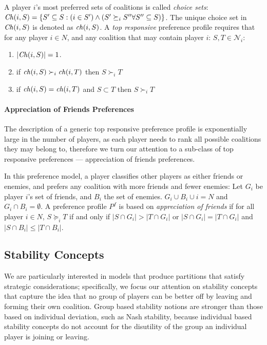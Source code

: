 A player $i$'s most preferred sets of coalitions is called \textit{choice sets}: $\mathit{Ch}(i, S) = \{S' \subseteq S: (i \in S') \wedge (S' \succeq_i S'' \forall S'' \subseteq S)\}$. The unique choice set in $\mathit{Ch}(i, S)$ is denoted as $\mathit{ch}(i, S)$. A {\em top responsive} preference profile requires that for any player $i \in N$, and any coalition that may contain player $i$: $S, T \in \mathcal{N}_i$:
\begin{enumerate}
  \item $|\mathit{Ch}(i, S)| = 1$.
  \item if $\mathit{ch}(i, S) \succ_i \mathit{ch}(i, T)$ then $S \succ_i T$
  \item if $\mathit{ch}(i, S) = \mathit{ch}(i, T)$ and $S \subset T$ then $S \succ_i T$
\end{enumerate}

\paragraph{Appreciation of Friends Preferences}
The description of a generic top responsive preference profile is exponentially large in the number of players, as each player needs to rank all possible coalitions they may belong to, therefore we turn our attention to a sub-class of top responsive preferences –-- appreciation of friends preferences.

In this preference model, a player classifies other players as either friends or enemies, and prefers any coalition with more friends and fewer enemies: Let $G_i$ be player $i$'s set of friends, and $B_i$ the set of enemies. $G_i \cup B_i \cup i = N$ and $G_i \cap B_i = \emptyset$. A preference profile $P^f$ is based on \textit{appreciation of friends} if for all player $i \in N$, $S \succeq_i T$ if and only if $|S \cap G_i| > |T \cap G_i|$ or $|S \cap G_i| = |T \cap G_i|$ and $|S \cap B_i| \leq |T \cap B_i|$.

\subsection{Stability Concepts} \label{subsec:stability}
We are particularly interested in models that produce partitions that satisfy strategic considerations; specifically, we focus our attention on stability concepts that capture the idea that no group of players can be better off by leaving and forming their own coalition. Group based stability notions are stronger than those based on individual deviation, such as Nash stability, because individual based stability concepts do not account for the disutility of the group an individual player is joining or leaving.

